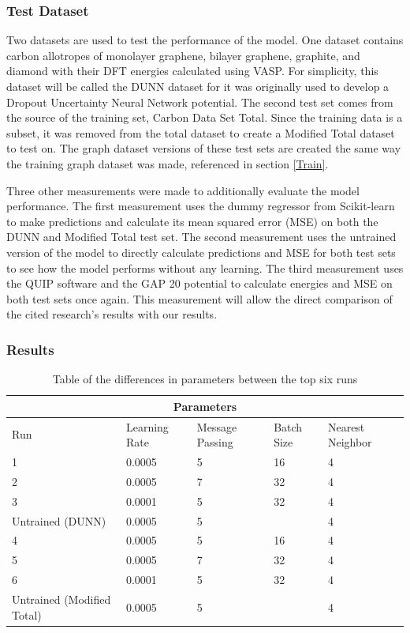 \documentclass[12pt, abstract = true]{scrartcl}
\begin{document}
\subsubsection{Test Dataset} 
Two datasets are used to test the performance of the model. One dataset contains carbon allotropes of monolayer graphene, bilayer graphene, graphite, and diamond with their DFT energies calculated using VASP. For simplicity, this dataset will be called the DUNN dataset for it was originally used to develop a Dropout Uncertainty Neural Network potential\cite{dunn}. The second test set comes from the source of the training set, Carbon Data Set Total. Since the training data is a subset, it was removed from the total dataset to create a Modified Total dataset to test on. The graph dataset versions of these test sets are created the same way the training graph dataset was made, referenced in section \ref{Train}. 

Three other measurements were made to additionally evaluate the model performance. The first measurement uses the dummy regressor from Scikit-learn to make predictions and calculate its mean squared error (MSE) on both the DUNN and Modified Total test set. The second measurement uses the untrained version of the model to directly calculate predictions and MSE for both test sets to see how the model performs without any learning. The third measurement uses the QUIP software and the GAP 20 potential\cite{gap20} to calculate energies and MSE on both test sets once again. This measurement will allow the direct comparison of the cited research's results with our results.

\subsubsection{Results} 

\begin{table}
    \centering
    \begin{tabular}{|p{3cm}||p{2cm}|p{2cm}|p{2cm}|p{2cm}|}
    \hline
    \multicolumn{5}{|c|}{Parameters} \\
    \hline
    Run & Learning Rate & Message Passing & Batch Size & Nearest Neighbor\\
    \hline
    1 & 0.0005 & 5 & 16 & 4\\
    2 & 0.0005 & 7 & 32 & 4\\    
    3 & 0.0001 & 5 & 32 & 4\\
    Untrained (DUNN) & 0.0005 & 5 & & 4\\
    4 & 0.0005 & 5 & 16 & 4\\
    5 & 0.0005 & 7 & 32 & 4\\
    6 & 0.0001 & 5 & 32 & 4\\
    Untrained (Modified Total) & 0.0005 & 5 & & 4\\
    \hline
    
    \end{tabular}
    \caption{Table of the differences in parameters between the top six runs}\label{tab:param}
\end{table}
\end{document}
